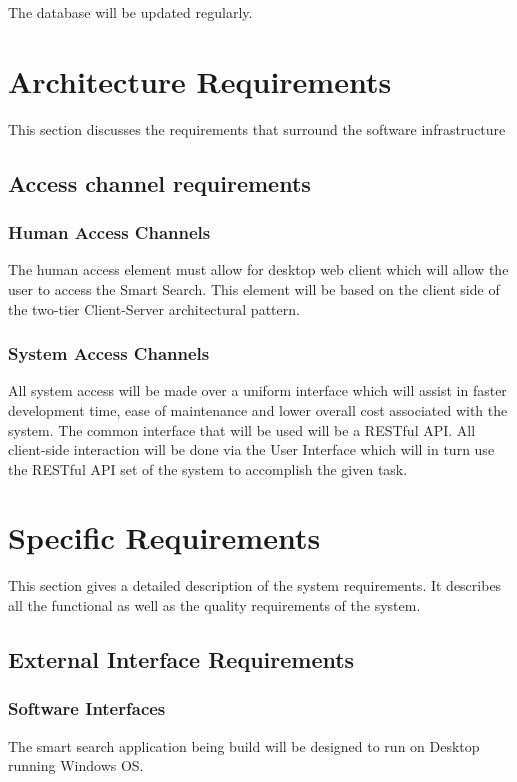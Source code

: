 \documentclass[a4paper,10pt]{article}
\begin{document}
	The database will be updated regularly.

	\newpage
	\section{Architecture Requirements}
	This section discusses the requirements that surround the software infrastructure

	\subsection {Access channel requirements}
		\subsubsection{Human Access Channels}
	The human access element must allow for desktop web client which will allow the user to access the Smart Search.
	This element will be based on the client side of the two-tier Client-Server architectural pattern.

		\subsubsection{System Access Channels}
	All system access will be made over a uniform interface which will assist in faster development time, ease of maintenance and 		lower overall cost associated with the system. The common interface that will be used will be a RESTful API. All client-side 		interaction will be done via the User Interface which will in turn use the RESTful API set of the system to accomplish the given 	task.

	
	\newpage
	\section{Specific Requirements}
This section gives a detailed description of the system requirements. It describes all the functional as well as the quality requirements of the system.

	\subsection{External Interface Requirements}

            \subsubsection{Software Interfaces}
The smart search application being build will be designed to run on Desktop running Windows OS.
\end{document}
